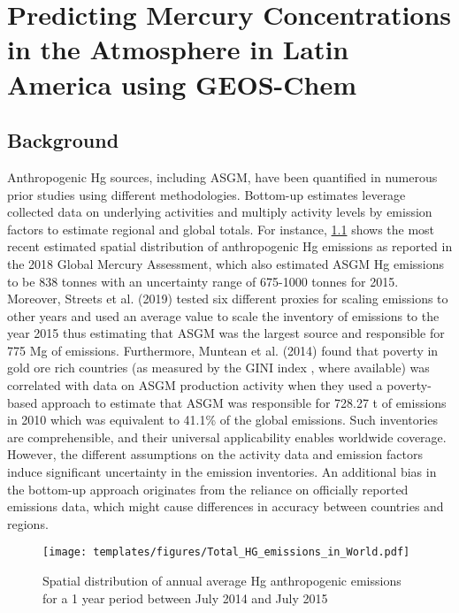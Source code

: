 \chapter{Predicting Mercury Concentrations in the Atmosphere in Latin America using GEOS-Chem }
\section{Background}
\begin{flushleft}
Anthropogenic Hg sources, including ASGM, have been quantified in numerous prior studies using different methodologies. Bottom-up estimates leverage collected data on underlying activities and multiply activity levels by emission factors to estimate regional and global totals. For instance, \ref{fig:World_Hg_em} shows the most recent estimated spatial distribution of anthropogenic Hg emissions as reported in the 2018 Global Mercury Assessment, which also estimated ASGM Hg emissions to be 838 tonnes with an uncertainty range of 675-1000 tonnes for 2015\cite{united_nations_environment_programme_technical_2019}. Moreover, Streets et al. (2019) tested six different proxies for scaling emissions to other years and used an average value to scale the inventory of emissions to the year 2015 thus estimating that ASGM was the largest source and responsible for 775 Mg of emissions\cite{streets_global_2019}. Furthermore, Muntean et al. (2014) found that poverty in  gold ore rich countries (as measured by the GINI index \cite{sadefo_kamdem_nice_2012}, where available) was correlated with data on ASGM production activity when they used a poverty-based approach to estimate that ASGM was responsible for 728.27 t of emissions in 2010 which was equivalent to 41.1\% of the global emissions\cite{muntean_evaluating_2018}. Such inventories are comprehensible, and their universal applicability enables worldwide coverage. However, the different assumptions on the activity data and emission factors induce significant uncertainty in the emission inventories. An additional bias in the bottom-up approach originates from the reliance on officially reported emissions data, which might cause differences in accuracy between countries and regions.
\begin{figure}[H]
  \texttt{[image: templates/figures/Total\_HG\_emissions\_in\_World.pdf]}
  \centering
  \caption{Spatial distribution of annual average Hg anthropogenic emissions for a 1 year period between July 2014 and July 2015}
  \label{fig:World_Hg_em}
\end{figure}
\FloatBarrier


\end{flushleft}
